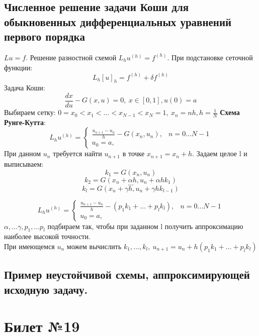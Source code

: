 \documentclass[a4paper]{article}
\begin{document}
\subsection{Численное решение задачи Коши для обыкновенных дифференциальных уравнений первого порядка}
$Lu=f$. Решение разностной схемой $L_hu^{(h)}=f^{(h)}$. При подстановке сеточной функции: $$ L_h[u]_h=f^{(h)}+\delta f^{(h)} $$
Задача Коши: $$ \frac{dx}{du}-G(x,u)=0,\ x\in[0,1],u(0)=a $$
Выбираем сетку: $0=x_0<x_1<\ldots<x_{N-1}<x_N=1, \ x_n=nh, h=\frac{1}{N}$ 
\textbf{Схема Рунге-Кутта}:\\
	$$L_hu^{(h)} = \begin{cases}
	\frac{u_{n+1}-u_n}{h} - G(x_n,u_n), & n=0\ldots N-1\\
	u_0=a, & \end{cases}$$
При данном $u_n$ требуется найти $u_{n+1}$ в точке $x_{n+1}=x_n+h$. Задаем целое l и выписываем:
$$ k_1=G(x_n,u_n)$$
$$ k_2=G(x_n + \alpha h, u_n+\alpha hk_1) $$
$$ \ldots $$
$$ k_l = G(x_n + \gamma h, u_n + \gamma hk_{l-1}) $$

$$L_hu^{(h)} = \begin{cases}
	\frac{u_{n+1}-u_n}{h} - (p_1 k_1 + \ldots + p_l k_l), & n=0\ldots N-1\\
	u_0=a, & \end{cases}$$
$\alpha, \ldots \gamma, p_1, \ldots p_l$ подбираем так, чтобы при заданном l получить аппроксимацию наиболее высокой точности. \\
При имеющемся $u_n$ можем вычислить $k_1, \ldots, k_l, \ u_{n+1}=u_n+h(p_1k_1 + \ldots + p_l k_l)$
\subsection{Пример неустойчивой схемы, аппроксимирующей исходную задачу.}

\section{Билет №19}
\end{document}

